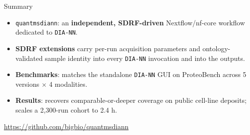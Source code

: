 \documentclass[aspectratio=169,11pt]{beamer}
\newcommand{\quantmsdiann}{\textcolor{qmblue}{\texttt{quantmsdiann}}}
\newcommand{\diann}{\texttt{DIA-NN}}
\begin{document}
\begin{frame}{Summary}
  \begin{itemize}
    \item \quantmsdiann{}: an \textbf{independent, SDRF-driven} Nextflow/nf-core
          workflow dedicated to \diann{}.
    \item \textbf{SDRF extensions} carry per-run acquisition parameters and
          ontology-validated sample identity into every \diann{} invocation
          and into the outputs.
    \item \textbf{Benchmarks}: matches the standalone \diann{} GUI on
          ProteoBench across 5 versions $\times$ 4 modalities.
    \item \textbf{Results}: recovers comparable-or-deeper coverage on public
          cell-line deposits; scales a 2{,}300-run cohort to 2.4 h.
  \end{itemize}
  \vspace{0.8em}
  \centering
  \footnotesize \url{https://github.com/bigbio/quantmsdiann}
\end{frame}
\end{document}

